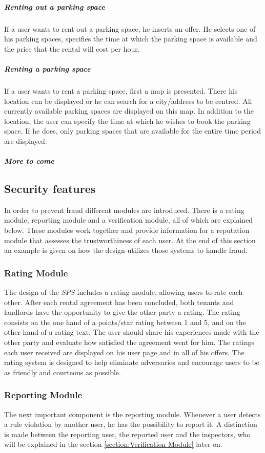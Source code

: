 \documentclass[
a4paper,     %
titlepage,   %
14pt         %
]{scrartcl}  %
\theoremstyle{mystyle}
\begin{document}
\subparagraph{Renting out a parking space} If a user wants to rent out a parking space, he inserts an offer. He selects one of his parking spaces, specifies the time at which the parking space is available and the price that the rental will cost per hour.

\subparagraph{Renting a parking space} If a user wants to rent a parking space, first a map is presented. There his location can be displayed or he can search for a city/address to be centred. All currently available parking spaces are displayed on this map. In addition to the location, the user can specify the time at which he wishes to book the parking space. If he does, only parking spaces that are available for the entire time period are displayed.

\subparagraph{More to come}
  
\subsection{Security features}
In order to prevent fraud different modules are introduced. There is a rating module, reporting module and a verification module, all of which are explained below. These modules work together and provide information for a reputation module that assesses the trustworthiness of each user. At the end of this section an example is given on how the design utilizes those systems to handle fraud.

\subsubsection{Rating Module} The design of the $SPS$ includes a rating module, allowing users to rate each other. After each rental agreement has been concluded, both tenants and landlords have the opportunity to give the other party a rating. The rating consists on the one hand of a points/star rating between 1 and 5, and on the other hand of a rating text. The user should share his experiences made with the other party and evaluate how satisfied the agreement went for him. The ratings each user received are displayed on his user page and in all of his offers. The rating system is designed to help eliminate adversaries and encourage users to be as friendly and courteous as possible.

\subsubsection{Reporting Module} The next important component is the reporting module. Whenever a user detects a rule violation by another user, he has the possibility to report it. A distinction is made between the reporting user, the reported user and the inspectors, who will be explained in the section \ref{section:Verification Module}  later on.
\end{document}
